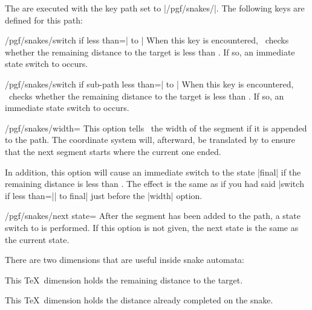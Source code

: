 \begin{command}{\pgfdeclaresnake{}}
\begin{command}{\state{}}
    The  are executed with the key path set to
    |/pgf/snakes/|. The following keys are defined for this path: 
    \begin{key}{/pgf/snakes/switch if less than=| to |}
      When this key is encountered, \pgfname\ checks whether the
      remaining distance to the target is less than
      . If so, an immediate state switch to  occurs.
    \end{key}
    \begin{key}{/pgf/snakes/switch if sub-path less than=| to |}
      When this key is encountered, \pgfname\ checks whether the
      remaining distance to the target is less than
      . If so, an immediate state switch to  occurs.
    \end{key}
    \begin{key}{/pgf/snakes/width=}
      This option tells \pgfname\ the width of the segment if it is
      appended to the path. The coordinate system will, afterward, be
      translated by  to ensure that the next segment
      starts where the current one ended.

      In addition, this option will cause an immediate switch to the
      state |final| if the remaining distance is less than
      . The effect is the same as if you had said
      |switch if less than=|| to final| just before
      the |width| option.
    \end{key}
    \begin{key}{/pgf/snakes/next state=}
      After the segment has been added to the path, a state switch to
       is performed. If this option is not given, the
      next state is the same as the current state.
    \end{key}
  
    There are two dimensions that are useful inside snake automata:
    \begin{command}{\pgfsnakeremainingdistance}
      This \TeX\ dimension holds the remaining distance to the target.
    \end{command}
    \begin{command}{\pgfsnakecompleteddistance}
      This \TeX\ dimension holds the distance already completed on the
      snake. 
    \end{command}
  \end{command}


\end{command}
